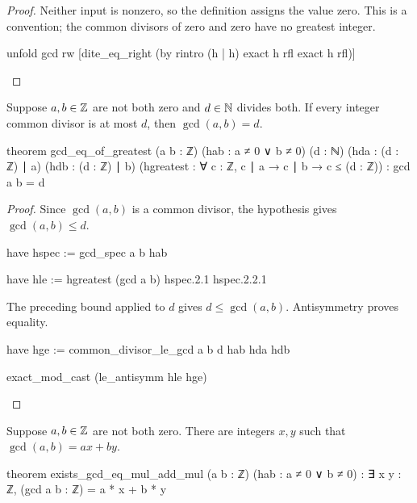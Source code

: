 \begin{proof}
  Neither input is nonzero, so the definition assigns the value zero.
  This is a convention; the common divisors of zero and zero have no greatest integer.

  \begin{lean}
    unfold gcd
    rw [dite_eq_right (by
      rintro (h | h)
      exact h rfl
      exact h rfl)]
  \end{lean}
\end{proof}

\begin{theorem}
  \label{ent:thm:gcd-eq-of-greatest}
  Suppose $a,b\in\mathbb{Z}$ are not both zero and $d\in\mathbb{N}$ divides both.
  If every integer common divisor is at most $d$, then $\gcd(a,b)=d$.

  \begin{lean}
    theorem gcd_eq_of_greatest (a b : ℤ) (hab : a ≠ 0 ∨ b ≠ 0) (d : ℕ)
        (hda : (d : ℤ) ∣ a) (hdb : (d : ℤ) ∣ b)
        (hgreatest : ∀ c : ℤ, c ∣ a → c ∣ b → c ≤ (d : ℤ)) : gcd a b = d
  \end{lean}
\end{theorem}

\begin{proof}
  Since $\gcd(a,b)$ is a common divisor, the hypothesis gives $\gcd(a,b)\le d$.

  \begin{lean}
    have hspec := gcd_spec a b hab

    have hle := hgreatest (gcd a b) hspec.2.1 hspec.2.2.1
  \end{lean}

  The preceding bound applied to $d$ gives $d\le\gcd(a,b)$.
  Antisymmetry proves equality.

  \begin{lean}
    have hge := common_divisor_le_gcd a b d hab hda hdb

    exact_mod_cast (le_antisymm hle hge)
  \end{lean}
\end{proof}

\begin{theorem}
  \label{ent:thm:bezout}
  Suppose $a,b\in\mathbb{Z}$ are not both zero.
  There are integers $x,y$ such that $\gcd(a,b)=ax+by$.

  \begin{lean}
    theorem exists_gcd_eq_mul_add_mul (a b : ℤ) (hab : a ≠ 0 ∨ b ≠ 0) :
        ∃ x y : ℤ, (gcd a b : ℤ) = a * x + b * y
  \end{lean}
\end{theorem}

